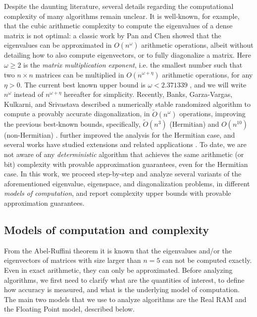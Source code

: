 \documentclass{article}
\begin{document}
    Despite the daunting literature, several details regarding the computational complexity of many algorithms remain unclear. 
    It is well-known, for example, that the cubic arithmetic complexity to compute the eigenvalues of a dense matrix is not optimal: a classic work by Pan and Chen \cite{pan1999complexity} showed that the eigenvalues can be approximated in $O(n^\omega)$ arithmetic operations, albeit without detailing how to also compute eigenvectors, or to fully diagonalize a matrix. 
    Here $\omega\geq 2$ is the \textit{matrix multiplication exponent}, i.e. the smallest number such that two $n\times n$ matrices can be multiplied in $O(n^{\omega+\eta})$ arithmetic operations, for any $\eta>0$. The current  best known upper bound is $\omega< 2.371339$  \cite{alman2024more}, and we will write $n^{\omega}$ instead of $n^{\omega+\eta}$ hereafter for simplicity. 
    Recently, Banks, Garza-Vargas, Kulkarni, and Srivastava \cite{banks2022pseudospectral} described a numerically stable randomized algorithm to compute a provably accurate diagonalization, in $\widetilde O(n^{\omega})$ operations, improving the previous  best-known bounds, specifically, $\widetilde O(n^3)$ (Hermitian) and $O(n^{10})$ (non-Hermitian) \cite{armentano2018stable}. \cite{shah2025hermitian} further improved the analysis for the Hermitian case, and several works have studied extensions and related applications \cite{demmel2024inverse,demmel2024generalized,schneider2024pseudospectral,sobczyk2024invariant}. 
    To date, we are not aware of any \emph{deterministic} algorithm  that achieves the same arithmetic (or bit) complexity with provable approximation guarantees, even for the Hermitian case.
    In this work, we proceed step-by-step and analyze several variants of the aforementioned eigenvalue, eigenspace, and diagonalization problems, in different \textit{models of computation}, and report complexity upper bounds with provable approximation guarantees.
    
    \subsection{Models of computation and complexity}
    From the Abel-Ruffini theorem it is known that the eigenvalues and/or the eigenvectors of matrices with size larger than $n=5$ can not be computed exactly. Even in exact arithmetic, they can only be approximated. Before analyzing algorithms, we first need to clarify what are the quantities of interest, to define how accuracy is measured, and what is the underlying model of computation. The main two models that we use to analyze algorithms are the Real RAM and the Floating Point model, described below. 
\end{document}
